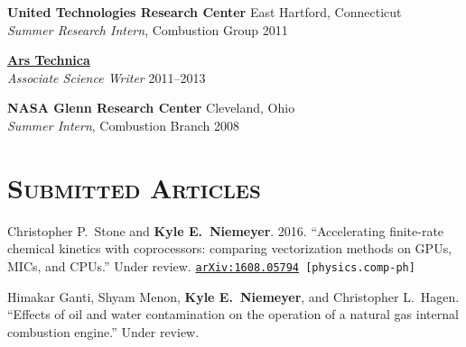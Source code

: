 \documentclass[margin,line,11pt]{res}
\makeatletter
\newlength{\bibhang}
\newlength{\bibsep}
 {\@listi \global\bibsep\itemsep \global\advance\bibsep by\parsep}
\newenvironment{bibenum*}
  {\renewcommand\labelenumi{\theenumi.}%
   \etaremune[
     topsep=0pt,
     itemsep=\bibsep,
     parsep=0pt,partopsep=0pt,
     itemindent=-\bibhang,
     leftmargin={\bibhang+\widthof{[999]}}]}
  {\endetaremune}
\makeatother
\begin{document}
\begin{resume}
\textbf{United Technologies Research Center} \hfill East Hartford, Connecticut \\
\emph{Summer Research Intern}, Combustion Group \hfill 2011

\textbf{\href{http://arstechnica.com/}{Ars Technica}} \\
\emph{Associate Science Writer} \hfill 2011--2013

\textbf{NASA Glenn Research Center} \hfill Cleveland, Ohio \\
\emph{Summer Intern}, Combustion Branch \hfill 2008

\section{\textsc{Submitted Articles}}

\begin{bibenum*}

\item Christopher P.~Stone and \textbf{Kyle E.~Niemeyer}.
2016.
``Accelerating finite-rate chemical kinetics with coprocessors: comparing vectorization methods on GPUs, MICs, and CPUs.''
Under review. {\tt \href{http://arxiv.org/abs/1608.05794}{arXiv:1608.05794} [physics.comp-ph]}

\item Himakar Ganti, Shyam Menon, \textbf{Kyle E.~Niemeyer}, and Christopher L.~Hagen.
``Effects of oil and water contamination on the operation of a natural gas internal combustion engine.''
Under review.


\end{bibenum*}
\end{resume}
\end{document}
